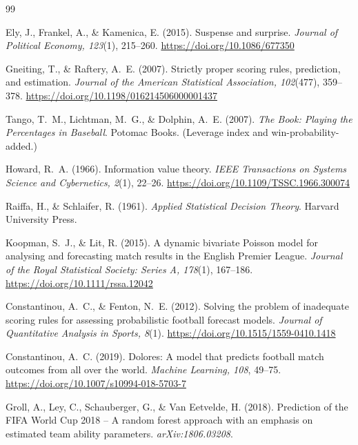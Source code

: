 \documentclass[11pt,a4paper]{article}
\begin{document}
\begin{thebibliography}{99}

Ely, J., Frankel, A., \& Kamenica, E. (2015). Suspense and surprise. \emph{Journal of Political Economy, 123}(1), 215--260. \url{https://doi.org/10.1086/677350}

Gneiting, T., \& Raftery, A.~E. (2007). Strictly proper scoring rules, prediction, and estimation. \emph{Journal of the American Statistical Association, 102}(477), 359--378. \url{https://doi.org/10.1198/016214506000001437}

Tango, T.~M., Lichtman, M.~G., \& Dolphin, A.~E. (2007). \emph{The Book: Playing the Percentages in Baseball}. Potomac Books. (Leverage index and win-probability-added.)

Howard, R.~A. (1966). Information value theory. \emph{IEEE Transactions on Systems Science and Cybernetics, 2}(1), 22--26. \url{https://doi.org/10.1109/TSSC.1966.300074}

Raiffa, H., \& Schlaifer, R. (1961). \emph{Applied Statistical Decision Theory}. Harvard University Press.

Koopman, S.~J., \& Lit, R. (2015). A dynamic bivariate Poisson model for analysing and forecasting match results in the English Premier League. \emph{Journal of the Royal Statistical Society: Series A, 178}(1), 167--186. \url{https://doi.org/10.1111/rssa.12042}

Constantinou, A.~C., \& Fenton, N.~E. (2012). Solving the problem of inadequate scoring rules for assessing probabilistic football forecast models. \emph{Journal of Quantitative Analysis in Sports, 8}(1). \url{https://doi.org/10.1515/1559-0410.1418}

Constantinou, A.~C. (2019). Dolores: A model that predicts football match outcomes from all over the world. \emph{Machine Learning, 108}, 49--75. \url{https://doi.org/10.1007/s10994-018-5703-7}

Groll, A., Ley, C., Schauberger, G., \& Van Eetvelde, H. (2018). Prediction of the FIFA World Cup 2018 -- A random forest approach with an emphasis on estimated team ability parameters. \emph{arXiv:1806.03208}.


\end{thebibliography}
\end{document}
